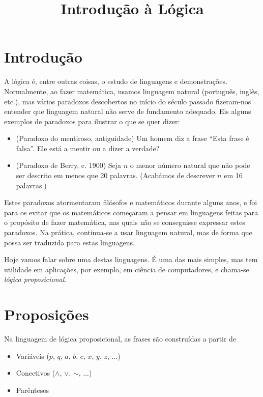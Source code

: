 \documentclass{article}
\title{Introdução à Lógica}
\author{}
\date{}
\theoremstyle{definition}
\theoremstyle{remark}
\newcommand*{\lneg}{\mathord{\sim}}
\begin{document}
	\maketitle

	\section{Introdução}

	A lógica é, entre outras coisas, o estudo de linguagens e demonstrações. Normalmente, ao fazer matemática, usamos linguagem natural (português, inglês, etc.), mas vários paradoxos descobertos no início do século passado fizeram-nos entender que linguagem natural não serve de fundamento adequado. Eis alguns exemplos de paradoxos para ilustrar o que se quer dizer:
	
	\begin{itemize}
	\item (Paradoxo do mentiroso, antiguidade) Um homem diz a frase ``Esta frase é falsa''. Ele está a mentir ou a dizer a verdade?
	
	\item (Paradoxo de Berry, c. 1900) Seja $n$ o menor número natural que não pode ser descrito em menos que 20 palavras. (Acabámos de descrever $n$ em 16 palavras.) 
	\end{itemize}
	
	Estes paradoxos atormentaram filósofos e matemáticos durante alguns anos, e foi para os evitar que os matemáticos começaram a pensar em linguagens feitas para o propósito de fazer matemática, nas quais não se conseguisse expressar estes paradoxos. Na prática, continua-se a usar linguagem natural, mas de forma que possa ser traduzida para estas linguagens.
	
	Hoje vamos falar sobre uma destas linguagens. É uma das mais simples, mas tem utilidade em aplicações, por exemplo, em ciência de computadores, e chama-se \textit{lógica proposicional}.
	
	\section{Proposições}
	
	Na linguagem de lógica proposicional, as frases são construídas a partir de
	
	\begin{itemize}
	\item Variáveis ($p$, $q$, $a$, $b$, $c$, $x$, $y$, $z$, ...)
	
	\item Conectivos ($\land$, $\lor$, $\lneg$, ...)
	
	\item Parênteses
	\end{itemize}
	
\end{document}
